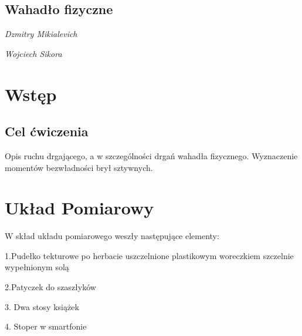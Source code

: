 \documentclass[]{article}
\begin{document}
\begin{figure}[tp!]
\end{figure}

\begin{center}
	\section*{Wahadło fizyczne}
	\emph{Dzmitry Mikialevich}
\end{center}
\begin{center}
	\emph{Wojciech Sikora}
\end{center}
\tableofcontents
\newpage

\section{Wstęp}

\subsection{Cel ćwiczenia}
Opis ruchu drgającego, a w szczególności drgań wahadła fizycznego. Wyznaczenie momentów
bezwładności brył sztywnych.

    


\section{Układ Pomiarowy}
W skład układu pomiarowego weszły następujące elementy:
\newline

1.Pudełko tekturowe po herbacie uszczelnione plastikowym woreczkiem szczelnie wypełnionym solą

2.Patyczek do szaszłyków

3. Dwa stosy książek

4. Stoper w smartfonie
\end{document}
